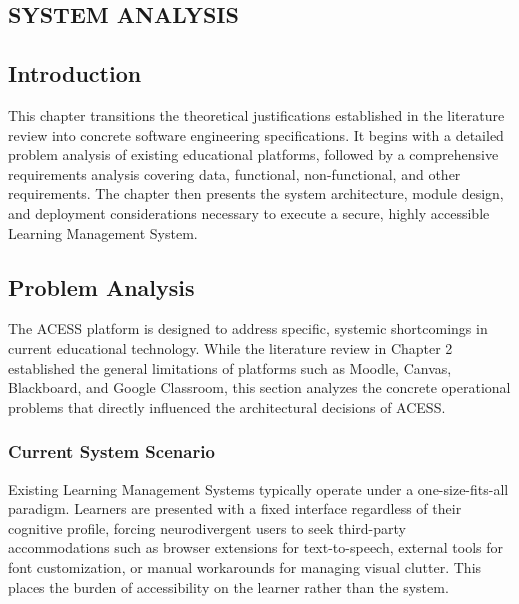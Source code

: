 \documentclass[12pt, oneside]{article} %
\begin{document}

\newpage
\vfill \null
\thispagestyle{empty}
\begin{center}
\section{SYSTEM ANALYSIS}
\end{center}
\vspace{2cm}

\subsection{Introduction}

This chapter transitions the theoretical justifications established in the literature review into concrete software engineering specifications. It begins with a detailed problem analysis of existing educational platforms, followed by a comprehensive requirements analysis covering data, functional, non-functional, and other requirements. The chapter then presents the system architecture, module design, and deployment considerations necessary to execute a secure, highly accessible Learning Management System.

\subsection{Problem Analysis}

The ACESS platform is designed to address specific, systemic shortcomings in current educational technology. While the literature review in Chapter 2 established the general limitations of platforms such as Moodle, Canvas, Blackboard, and Google Classroom, this section analyzes the concrete operational problems that directly influenced the architectural decisions of ACESS.

\subsubsection{Current System Scenario}

Existing Learning Management Systems typically operate under a one-size-fits-all paradigm. Learners are presented with a fixed interface regardless of their cognitive profile, forcing neurodivergent users to seek third-party accommodations such as browser extensions for text-to-speech, external tools for font customization, or manual workarounds for managing visual clutter. This places the burden of accessibility on the learner rather than the system.
\end{document}

